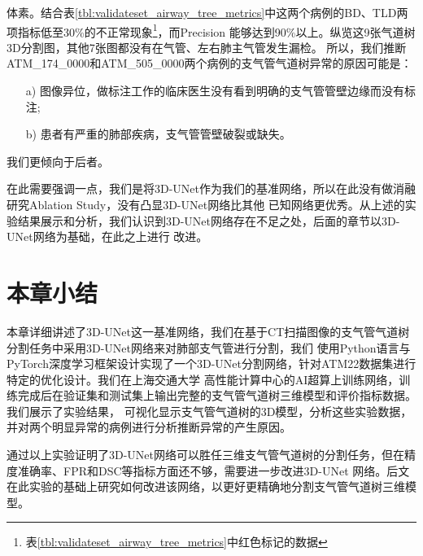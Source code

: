 体素。结合表\ref{tbl:validateset_airway_tree_metrics}中这两个病例的BD、TLD两项指标低至30\%的不正常现象\footnote{
表\ref{tbl:validateset_airway_tree_metrics}中红色标记的数据}，而Precision
能够达到90\%以上。纵览这9张气道树3D分割图，其他7张图都没有在气管、左右肺主气管发生漏检。 
所以，我们推断ATM\_174\_0000和ATM\_505\_0000两个病例的支气管气道树异常的原因可能是：
\begin{enumerate}
    \item[a)] 图像异位，做标注工作的临床医生没有看到明确的支气管管壁边缘而没有标注;
    \item[b)] 患者有严重的肺部疾病，支气管管壁破裂或缺失。
\end{enumerate}
我们更倾向于后者。

在此需要强调一点，我们是将3D-UNet作为我们的基准网络，所以在此没有做消融研究Ablation Study，没有凸显3D-UNet网络比其他
已知网络更优秀。从上述的实验结果展示和分析，我们认识到3D-UNet网络存在不足之处，后面的章节以3D-UNet网络为基础，在此之上进行
改进。

\section{本章小结}

本章详细讲述了3D-UNet这一基准网络，我们在基于CT扫描图像的支气管气道树分割任务中采用3D-UNet网络来对肺部支气管进行分割，我们
使用Python语言与PyTorch深度学习框架设计实现了一个3D-UNet分割网络，针对ATM22数据集进行特定的优化设计。我们在上海交通大学
高性能计算中心的AI超算上训练网络，训练完成后在验证集和测试集上输出完整的支气管气道树三维模型和评价指标数据。我们展示了实验结果，
可视化显示支气管气道树的3D模型，分析这些实验数据，并对两个明显异常的病例进行分析推断异常的产生原因。

通过以上实验证明了3D-UNet网络可以胜任三维支气管气道树的分割任务，但在精度准确率、FPR和DSC等指标方面还不够，需要进一步改进3D-UNet
网络。后文在此实验的基础上研究如何改进该网络，以更好更精确地分割支气管气道树三维模型。
